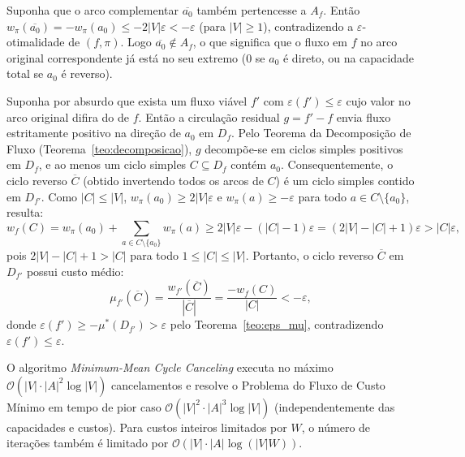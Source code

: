 \begin{demonstracao}
Suponha que o arco complementar $\overline{a_0}$ também pertencesse a $A_f$. Então $w_\pi(\overline{a_0}) = -w_\pi(a_0) \le -2|V|\varepsilon < -\varepsilon$ (para $|V| \ge 1$), contradizendo a $\varepsilon$-otimalidade de $(f, \pi)$. Logo $\overline{a_0} \notin A_f$, o que significa que o fluxo em $f$ no arco original correspondente já está no seu extremo ($0$ se $a_0$ é direto, ou na capacidade total se $a_0$ é reverso).

Suponha por absurdo que exista um fluxo viável $f'$ com $\varepsilon(f') \le \varepsilon$ cujo valor no arco original difira do de $f$. Então a circulação residual $g = f' - f$ envia fluxo estritamente positivo na direção de $a_0$ em $D_f$. Pelo Teorema da Decomposição de Fluxo (Teorema~\ref{teo:decomposicao}), $g$ decompõe-se em ciclos simples positivos em $D_f$, e ao menos um ciclo simples $C \subseteq D_f$ contém $a_0$. Consequentemente, o ciclo reverso $\overline{C}$ (obtido invertendo todos os arcos de $C$) é um ciclo simples contido em $D_{f'}$. Como $|C| \le |V|$, $w_\pi(a_0) \ge 2|V|\varepsilon$ e $w_\pi(a) \ge -\varepsilon$ para todo $a \in C \setminus \{a_0\}$, resulta:
\begin{equation*}
    w_f(C) = w_\pi(a_0) + \sum_{a \in C \setminus \{a_0\}} w_\pi(a) \ge 2|V|\varepsilon - (|C| - 1)\varepsilon = (2|V| - |C| + 1)\varepsilon > |C|\varepsilon,
\end{equation*}
pois $2|V| - |C| + 1 > |C|$ para todo $1 \le |C| \le |V|$. Portanto, o ciclo reverso $\overline{C}$ em $D_{f'}$ possui custo médio:
\begin{equation*}
    \mu_{f'}(\overline{C}) = \frac{w_{f'}(\overline{C})}{|\overline{C}|} = \frac{-w_f(C)}{|C|} < -\varepsilon,
\end{equation*}
donde $\varepsilon(f') \ge -\mu^*(D_{f'}) > \varepsilon$ pelo Teorema~\ref{teo:eps_mu}, contradizendo $\varepsilon(f') \le \varepsilon$.
\end{demonstracao}

\begin{teorema}
O algoritmo \textit{Minimum-Mean Cycle Canceling} executa no máximo $\mathcal{O}(|V| \cdot |A|^2 \log |V|)$ cancelamentos e resolve o Problema do Fluxo de Custo Mínimo em tempo de pior caso $\mathcal{O}(|V|^2 \cdot |A|^3 \log |V|)$ (independentemente das capacidades e custos). Para custos inteiros limitados por $W$, o número de iterações também é limitado por $\mathcal{O}(|V| \cdot |A| \log(|V|W))$.
\end{teorema}

